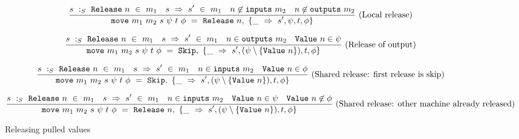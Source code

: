 \begin{figure*}


$$
\ruleI
{
        \CheckStateTypeM{m_1}{s}{\Release{n}}
        \quad
        \TransUM{s}{s'}{m_1}
        \quad
        n \not\in \inputs{m_2}
        \quad
        n \not\in \outputs{m_2}
}
{
    \MoveOut
        {\sptp}
        {\Release{n}}
        { 
          \MoveTU{s', \psi, t, \phi }
         }
}
\textrm{(Local release)}
$$

$$
\ruleI
{
        \CheckStateTypeM{m_1}{s}{\Release{n}}
        \quad
        \TransUM{s}{s'}{m_1}
        \quad
        n \in \outputs{m_2}
        \quad
        \Value{n} \in \psi
}
{
    \MoveOut
        {\sptp}
        {\Skip}
        { 
          \MoveTU{s', (\psi \setminus \{\Value{n}\}), t, \phi }
         }
}
\textrm{(Release of output)}
$$

$$
\ruleI
{
        \CheckStateTypeM{m_1}{s}{\Release{n}}
        \quad
        \TransUM{s}{s'}{m_1}
        \quad
        n \in \inputs{m_2}
        \quad
        \Value{n} \in \phi
}
{
    \MoveOut
        {\sptp}
        {\Skip}
        { 
          \MoveTU{s', (\psi \setminus \{\Value{n}\}), t, \phi }
         }
}
\textrm{(Shared release: first release is skip)}
$$

$$
\ruleI
{
        \CheckStateTypeM{m_1}{s}{\Release{n}}
        \quad
        \TransUM{s}{s'}{m_1}
        \quad
        n \in \inputs{m_2}
        \quad
        \Value{n} \in \psi
        \quad
        \Value{n} \not\in \phi
}
{
    \MoveOut
        {\sptp}
        {\Release{n}}
        { 
          \MoveTU{s', (\psi \setminus \{\Value{n}\}), t, \phi }
         }
}
\textrm{(Shared release: other machine already released)}
$$


\caption{Releasing pulled values}
\label{fig:merge:gen:release}
\end{figure*}

